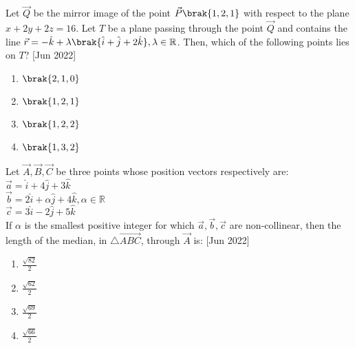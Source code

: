 	\item Let $\vec{Q}$ be the mirror image of the point $\vec{P}\brak{1, 2, 1}$ with respect to the plane $x+2y+2z=16$. Let $T$ be a plane passing through the point $\vec{Q}$ and contains the line $\vec{r}=-\hat{k}+\lambda\brak{\hat{i}+\hat{j}+2\hat{k}},\lambda\in\mathbb{R}$. Then, which of the following points lies on $T$? \hfill{[Jun 2022]}
		\begin{enumerate}
			\item $\brak{2,1,0}$\\
			\item $\brak{1,2,1}$\\
			\item $\brak{1,2,2}$\\
			\item $\brak{1,3,2}$\\
		\end{enumerate}
	\item Let $\vec{A},\vec{B},\vec{C}$ be three points whose position vectors respectively are:\\ 
		$\vec{a}=\hat{i}+4\hat{j}+3\hat{k}$\\
		$\vec{b}=2\hat{i}+\alpha\hat{j}+4\hat{k},\alpha\in\mathbb{R}$\\
		$\vec{c}=3\hat{i}-2\hat{j}+5\hat{k}$\\
		If $\alpha$ is the smallest positive integer for which $\vec{a},\vec{b},\vec{c}$ are non-collinear, then the length of the median, in $\triangle\vec{ABC}$, through $\vec{A}$ is: \hfill{[Jun 2022]}
		\begin{enumerate}
			\item $\frac{\sqrt{82}}{2}$\\
			\item $\frac{\sqrt{62}}{2}$\\
			\item $\frac{\sqrt{69}}{2}$\\
			\item $\frac{\sqrt{66}}{2}$\\
		\end{enumerate}


